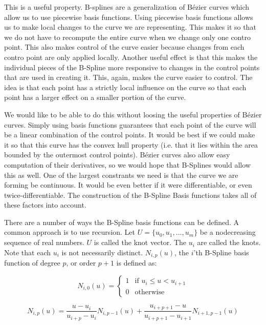 This is a useful property.
B-splines are a generalization of B\'{e}zier curves which allow us to use piecewise basis functions.
Using piecewise basis functions allows us to make local changes to the curve we are representing.
This makes it so that we do not have to recompute the entire curve when we change only one contro point.
This also makes control of the curve easier because changes from each contro point are only applied locally.
Another useful effect is that this makes the individual pieces of the B-Spline more responsive to changes in the control points that are used in creating it.
This, again, makes the curve easier to control.
The idea is that each point has a strictly local influence on the curve so that each point has a larger effect on a smaller portion of the curve.

We would like to be able to do this without loosing the useful properties of B\'{e}zier curves.
Simply using basis functions guarantees that each point of the curve will be a linear combination of the control points.
It would be best if we could make it so that this curve has the convex hull property (i.e. that it lies within the area bounded by the outermost control points).
B\'{e}zier curves also allow easy computation of their derivatives, so we would hope that B-Splines would allow this as well.
One of the largest constrants we need is that the curve we are forming be continuous.
It would be even better if it were differentiable, or even twice-differentiable.
The construction of the B-Spline Basis functions takes all of these factors into account.

There are a number of ways the B-Spline basis functions can be defined.
A common approach is to use recursion.
Let $U = \lbrace u_0, u_1, ... , u_m \rbrace$ be a nodecreasing sequence of real numbers.
$U$ is called the knot vector.
The $u_i$ are called the knots.
Note that each $u_i$ is not necessarily distinct.
$N_{i,p}(u)$, the $i$'th B-Spline basis function of degree $p$, or order $p+1$ is defined as:

\begin{equation}
N_{i,0}(u) = 
\begin{cases}
1 & \text{if } u_i \leq u < u_{i+1} \\
0 & \text{otherwise}
\end{cases}
\end{equation}

\begin{equation}
N_{i,p}(u) = \frac{u - u_i}{u_{i+p} - u_i} N_{i,p-1}(u) + \frac{u_{i + p + 1} - u}{u_{i + p + 1} - u_{i + 1}} N_{i+1,p-1}(u)
\end{equation}

